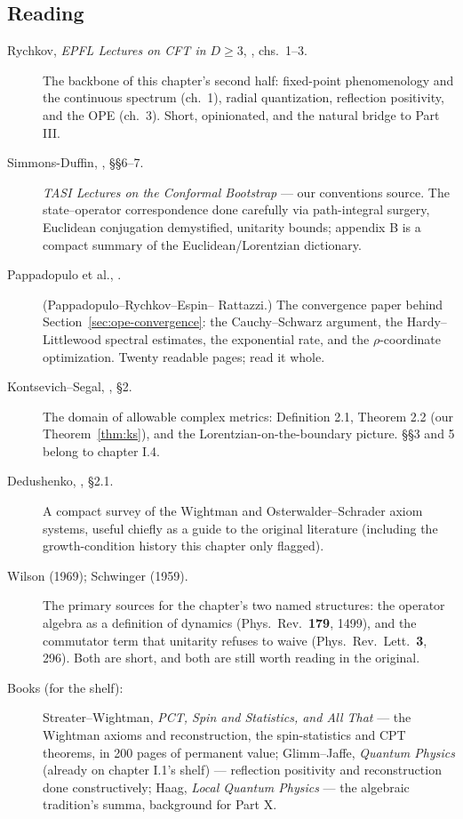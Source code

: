 \subsection*{Reading}

\begin{description}
\item[Rychkov, \emph{EPFL Lectures on CFT in $D \ge 3$}, ,
chs.\ 1--3.] The backbone of this chapter's second half: fixed-point
phenomenology and the continuous spectrum (ch.\ 1), radial quantization,
reflection positivity, and the OPE (ch.\ 3). Short, opinionated, and the
natural bridge to Part III.
\item[Simmons-Duffin, , \S\S6--7.] \emph{TASI Lectures on
the Conformal Bootstrap} --- our conventions source. The state--operator
correspondence done carefully via path-integral surgery, Euclidean
conjugation demystified, unitarity bounds; appendix B is a compact summary of
the Euclidean/Lorentzian dictionary.
\item[Pappadopulo et al., .] (Pappadopulo--Rychkov--Espin--%
Rattazzi.) The convergence paper behind Section~\ref{sec:ope-convergence}:
the Cauchy--Schwarz argument, the Hardy--Littlewood spectral estimates, the
exponential rate, and the $\rho$-coordinate optimization. Twenty readable
pages; read it whole.
\item[Kontsevich--Segal, , \S2.] The domain of allowable
complex metrics: Definition 2.1, Theorem 2.2 (our Theorem~\ref{thm:ks}), and
the Lorentzian-on-the-boundary picture. \S\S3 and 5 belong to chapter I.4.
\item[Dedushenko, , \S2.1.] A compact survey of the
Wightman and Osterwalder--Schrader axiom systems, useful chiefly as a guide
to the original literature (including the growth-condition history this
chapter only flagged).
\item[Wilson (1969); Schwinger (1959).] The primary sources for the
chapter's two named structures: the operator algebra as a definition of
dynamics (Phys.\ Rev.\ \textbf{179}, 1499), and the commutator term that
unitarity refuses to waive (Phys.\ Rev.\ Lett.\ \textbf{3}, 296). Both are
short, and both are still worth reading in the original.
\item[Books (for the shelf):] Streater--Wightman, \emph{PCT, Spin and
Statistics, and All That} --- the Wightman axioms and reconstruction, the
spin-statistics and CPT theorems, in 200 pages of permanent value;
Glimm--Jaffe, \emph{Quantum Physics} (already on chapter I.1's shelf) ---
reflection positivity and reconstruction done constructively; Haag,
\emph{Local Quantum Physics} --- the algebraic tradition's summa, background
for Part X.
\end{description}
